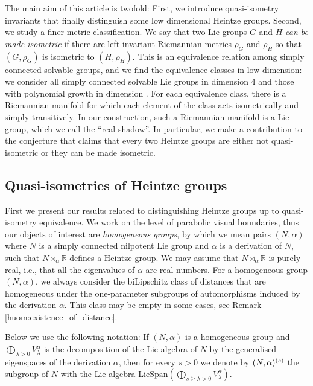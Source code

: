 \documentclass[a4paper,12pt]{amsart}
\newcommand{\pp}{\mathrm}
\theoremstyle{plain}
\theoremstyle{definition}
\theoremstyle{plain}
\theoremstyle{remark}
\newcommand{\laina}[1]{``#1''}
\begin{document}
The main aim of this article is twofold: First, we introduce quasi-isometry invariants that finally distinguish some low dimensional Heintze groups. Second, 
we study a finer metric classification.
We say that two Lie groups \( G\) and \( H\) \emph{can be made isometric} if there are left-invariant Riemannian metrics \( \rho_G \) and \( \rho_H \) so that \( (G,\rho_G) \) is isometric  to \( (H,\rho_H) \). This is an equivalence relation among simply connected solvable groups, and we find the equivalence classes in low dimension: 
we consider all simply connected solvable Lie groups in dimension 4 and those with polynomial growth in dimension .
For each equivalence class, there is a Riemannian manifold for which each element of the class acts isometrically and simply transitively.
In our construction, such a Riemannian manifold is a Lie group, which we call the \laina{real-shadow}. 
In particular, we make a contribution to the conjecture that claims that every two Heintze groups are  either not quasi-isometric or 
they can be made isometric.

\subsection{Quasi-isometries of Heintze groups}

First we present our results related to distinguishing Heintze groups up to quasi-isometry equivalence. We work on the level of parabolic visual boundaries, thus our objects of interest are \emph{homogeneous groups}, by which we mean pairs \( (N,\alpha) \) where \( N \) is a simply connected nilpotent Lie group and \( \alpha \) is a derivation of \( N\), such that \( N \rtimes_\alpha \mathbb{R} \) defines a Heintze group. We may assume that \( N \rtimes_\alpha \mathbb{R} \) is purely real, i.e., that all the eigenvalues of \( \alpha \) are real numbers. 
For a homogeneous group \( (N,\alpha) \), we always consider the biLipschitz class of distances that are homogeneous under the one-parameter subgroups of automorphisms induced by the derivation \( \alpha \). This class may be empty in some cases, see Remark \ref{huom:existence_of_distance}.

Below we use the following notation: If \( (N,\alpha) \) is a homogeneous group and \( \bigoplus_{\lambda >0 } V^\alpha_\lambda \) is the decomposition of the Lie algebra of \( N \) by the generalised eigenspaces of the derivation \( \alpha \), then for every \( s > 0 \) we denote by \( (N,\alpha)^{(s)} \) the subgroup of \( N\) with the Lie algebra \( \pp{LieSpan} (\bigoplus_{s \ge \lambda >0 } V^\alpha_\lambda) \).
\end{document}
